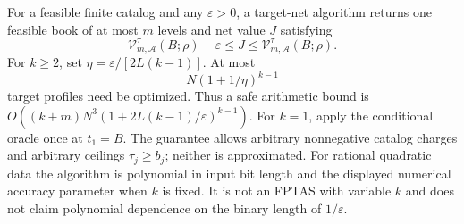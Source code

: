\begin{theorem}\label{thm:r45-net}
For a feasible finite catalog and any $\varepsilon>0$, a target-net algorithm returns one feasible book of at most $m$ levels and net value $J$ satisfying
\begin{equation}\label{eq:r45-net-bound}
 \mathcal V_{m,\mathcal A}^{\tau}(B;\rho)-\varepsilon\leq J
 \leq\mathcal V_{m,\mathcal A}^{\tau}(B;\rho).
\end{equation}
For $k\geq2$, set $\eta=\varepsilon/[2L(k-1)]$. At most
\begin{equation}\label{eq:r45-net-size}
 N(1+1/\eta)^{k-1}
\end{equation}
target profiles need be optimized. Thus a safe arithmetic bound is
$O((k+m)N^3(1+2L(k-1)/\varepsilon)^{k-1})$.
For $k=1$, apply the conditional oracle once at $t_1=B$.
The guarantee allows arbitrary nonnegative catalog charges and arbitrary ceilings $\tau_j\geq b_j$; neither is approximated. For rational quadratic data the algorithm is polynomial in input bit length and the displayed numerical accuracy parameter when $k$ is fixed. It is not an FPTAS with variable $k$ and does not claim polynomial dependence on the binary length of $1/\varepsilon$.
\end{theorem}
